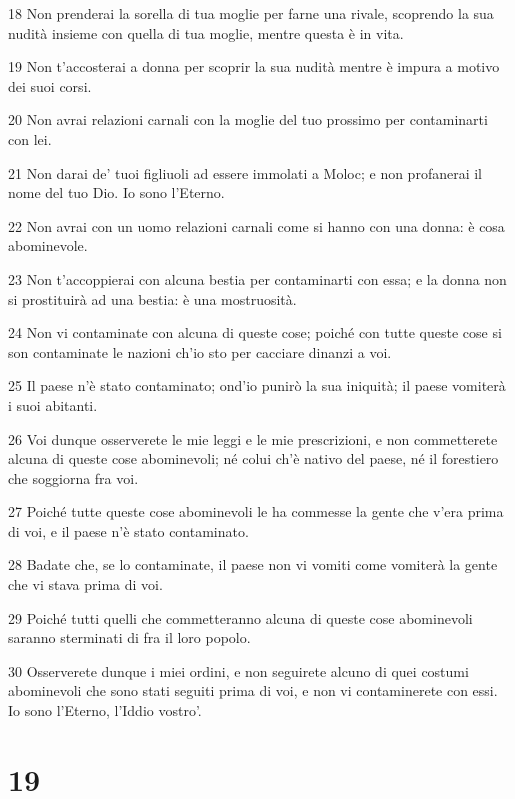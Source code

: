 \par 18 Non prenderai la sorella di tua moglie per farne una rivale, scoprendo la sua nudità insieme con quella di tua moglie, mentre questa è in vita.
\par 19 Non t'accosterai a donna per scoprir la sua nudità mentre è impura a motivo dei suoi corsi.
\par 20 Non avrai relazioni carnali con la moglie del tuo prossimo per contaminarti con lei.
\par 21 Non darai de' tuoi figliuoli ad essere immolati a Moloc; e non profanerai il nome del tuo Dio. Io sono l'Eterno.
\par 22 Non avrai con un uomo relazioni carnali come si hanno con una donna: è cosa abominevole.
\par 23 Non t'accoppierai con alcuna bestia per contaminarti con essa; e la donna non si prostituirà ad una bestia: è una mostruosità.
\par 24 Non vi contaminate con alcuna di queste cose; poiché con tutte queste cose si son contaminate le nazioni ch'io sto per cacciare dinanzi a voi.
\par 25 Il paese n'è stato contaminato; ond'io punirò la sua iniquità; il paese vomiterà i suoi abitanti.
\par 26 Voi dunque osserverete le mie leggi e le mie prescrizioni, e non commetterete alcuna di queste cose abominevoli; né colui ch'è nativo del paese, né il forestiero che soggiorna fra voi.
\par 27 Poiché tutte queste cose abominevoli le ha commesse la gente che v'era prima di voi, e il paese n'è stato contaminato.
\par 28 Badate che, se lo contaminate, il paese non vi vomiti come vomiterà la gente che vi stava prima di voi.
\par 29 Poiché tutti quelli che commetteranno alcuna di queste cose abominevoli saranno sterminati di fra il loro popolo.
\par 30 Osserverete dunque i miei ordini, e non seguirete alcuno di quei costumi abominevoli che sono stati seguiti prima di voi, e non vi contaminerete con essi. Io sono l'Eterno, l'Iddio vostro'.

\chapter{19}

